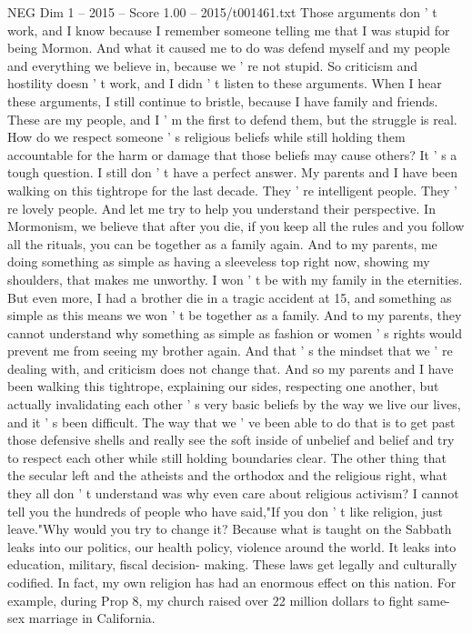 \begin{textsample}{NEG Dim 1 – 2015 – Score 1.00 – 2015/t001461.txt}
Those arguments don ' t work, and I know because I remember someone telling me that I was stupid for being Mormon.
And what it caused me to do was defend myself and my people and everything we believe in, because we ' re not stupid.
So criticism and hostility doesn ' t work, and I didn ' t listen to these arguments.
When I hear these arguments, I still continue to bristle, because I have family and friends.
These are my people, and I ' m the first to defend them, but the struggle is real.
How do we respect someone ' s religious beliefs while still holding them accountable for the harm or damage that those beliefs may cause others?
It ' s a tough question.
I still don ' t have a perfect answer.
My parents and I have been walking on this tightrope for the last decade.
They ' re intelligent people.
They ' re lovely people.
And let me try to help you understand their perspective.
In Mormonism, we believe that after you die, if you keep all the rules and you follow all the rituals, you can be together as a family again.
And to my parents, me doing something as simple as having a sleeveless top right now, showing my shoulders, that makes me unworthy.
I won ' t be with my family in the eternities.
But even more, I had a brother die in a tragic accident at 15, and something as simple as this means we won ' t be together as a family.
And to my parents, they cannot understand why something as simple as fashion or women ' s rights would prevent me from seeing my brother again.
And that ' s the mindset that we ' re dealing with, and criticism does not change that.
And so my parents and I have been walking this tightrope, explaining our sides, respecting one another, but actually invalidating each other ' s very basic beliefs by the way we live our lives, and it ' s been difficult.
The way that we ' ve been able to do that is to get past those defensive shells and really see the soft inside of unbelief and belief and try to respect each other while still holding boundaries clear.
The other thing that the secular left and the atheists and the orthodox and the religious right, what they all don ' t understand was why even care about religious activism?
I cannot tell you the hundreds of people who have said,"If you don ' t like religion, just leave."Why would you try to change it?
Because what is taught on the Sabbath leaks into our politics, our health policy, violence around the world.
It leaks into education, military, fiscal decision- making.
These laws get legally and culturally codified.
In fact, my own religion has had an enormous effect on this nation.
For example, during Prop 8, my church raised over 22 million dollars to fight same-sex marriage in California.

\end{textsample}
